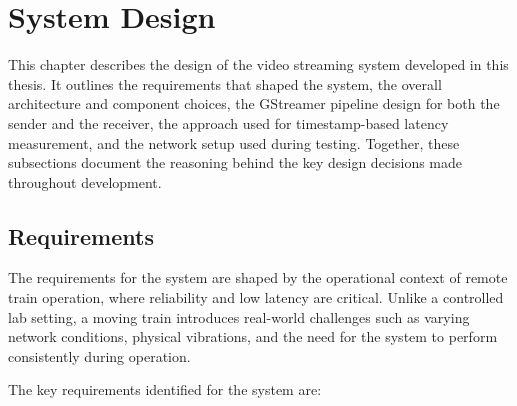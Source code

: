 \section{System Design}\label{chap:systemdesign}

This chapter describes the design of the video streaming system developed in this thesis. It outlines the requirements that shaped the system, the overall architecture and component choices, the GStreamer pipeline design for both the sender and the receiver, the approach used for timestamp-based latency measurement, and the network setup used during testing. Together, these subsections document the reasoning behind the key design decisions made throughout development.

\vspace{5mm}
\subsection{Requirements}

The requirements for the system are shaped by the operational context of remote train operation, where reliability and low latency are critical. Unlike a controlled lab setting, a moving train introduces real-world challenges such as varying network conditions, physical vibrations, and the need for the system to perform consistently during operation.

The key requirements identified for the system are:

